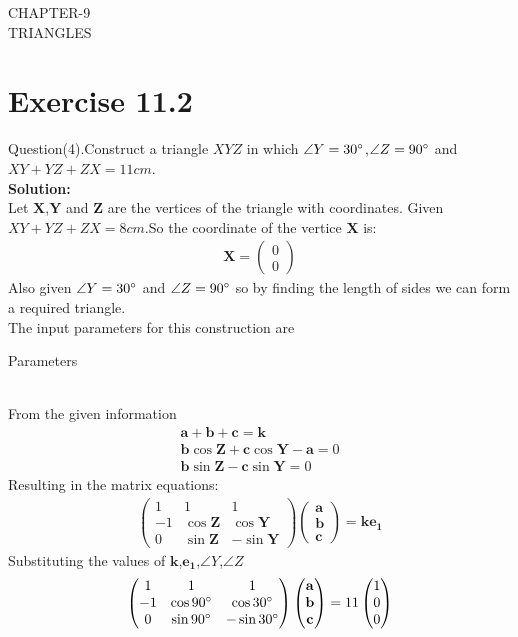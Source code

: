 \documentclass{article}
\newcommand{\myvec}[1]{\ensuremath{\begin{pmatrix}#1\end{pmatrix}}}
\let\vec\mathbf
\begin{document}
\begin{center}
        \textbf\large{CHAPTER-9 \\ TRIANGLES}
\end{center}
\section{Exercise 11.2}
Question(4).Construct a triangle $XYZ$ in which $\angle{Y}=30\degree$,$\angle{Z}=90\degree$ and $XY+YZ+ZX=11cm$. \\
\textbf{Solution:}\\
Let $\vec{X}$,$\vec{Y}$ and $\vec{Z}$ are the vertices of the triangle with coordinates.
Given $XY+YZ+ZX=8cm$.So the coordinate of the vertice  $\vec{X}$ is:
\begin{align}
{
\vec{X} =\myvec{0\\0}
}
\end{align}
Also given $\angle{Y}=30\degree$ and $\angle{Z}=90\degree$ so by finding the length of sides we can form a required triangle. \\
 The input parameters for this construction are\\
 \begin{table}[h]
	 \centering
	 
	 \caption{Parameters}
	 \label{tab:table1}
 \end{table}\\
From the given information\\
 \begin{align}
     \vec{a}+\vec{b}+\vec{c}=\vec{k}\\
	 \vec{b}\cos{\vec{Z}}+\vec{c}\cos{\vec{Y}}-\vec{a}=0\\
	 \vec{b}\sin{\vec{Z}}-\vec{c}\sin{\vec{Y}}=0
 \end{align}
 Resulting in the matrix equations:
 \begin{align}
	 \myvec{1 & 1 & 1\\-1 & \cos{\vec{Z}} & \cos{\vec{Y}}\\0 & \sin{\vec{Z}} & -\sin{\vec{Y}}}\myvec{\vec{a}\\ \vec{b}\\ \vec{c}}=\vec{k}\vec{e_1}
 \end{align}
 Substituting the values of $\vec{k}$,$\vec{e_1}$,$\angle{Y}$,$\angle{Z}$
 \begin{align}
     \myvec{1 & 1 & 1\\-1 & \cos{90\degree} & \cos{30\degree}\\ 0 & \sin{90\degree} & -\sin{30\degree}}\myvec{\vec{a}\\ \vec{b}\\ \vec{c}}= 11\myvec{1 \\ 0 \\ 0 }
 \end{align}
\end{document}
